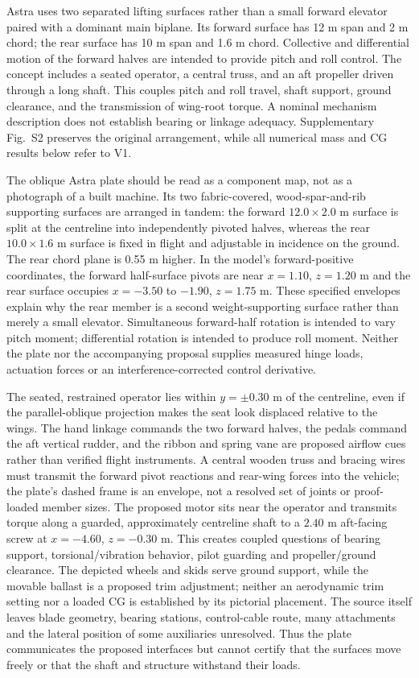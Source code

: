 \documentclass[11pt,a4paper]{article}
\begin{document}
Astra uses two separated lifting surfaces rather than a small forward elevator paired with a dominant main biplane. Its forward surface has 12 m span and 2 m chord; the rear surface has 10 m span and 1.6 m chord. Collective and differential motion of the forward halves are intended to provide pitch and roll control. The concept includes a seated operator, a central truss, and an aft propeller driven through a long shaft. This couples pitch and roll travel, shaft support, ground clearance, and the transmission of wing-root torque. A nominal mechanism description does not establish bearing or linkage adequacy. Supplementary Fig.~S2 preserves the original arrangement, while all numerical mass and CG results below refer to V1.



The oblique Astra plate should be read as a component map, not as a photograph of a built machine. Its two fabric-covered, wood-spar-and-rib supporting surfaces are arranged in tandem: the forward $12.0\times2.0$ m surface is split at the centreline into independently pivoted halves, whereas the rear $10.0\times1.6$ m surface is fixed in flight and adjustable in incidence on the ground. The rear chord plane is 0.55 m higher. In the model's forward-positive coordinates, the forward half-surface pivots are near $x=1.10$, $z=1.20$ m and the rear surface occupies $x=-3.50$ to $-1.90$, $z=1.75$ m. These specified envelopes explain why the rear member is a second weight-supporting surface rather than merely a small elevator. Simultaneous forward-half rotation is intended to vary pitch moment; differential rotation is intended to produce roll moment. Neither the plate nor the accompanying proposal supplies measured hinge loads, actuation forces or an interference-corrected control derivative.

The seated, restrained operator lies within $y=\pm0.30$ m of the centreline, even if the parallel-oblique projection makes the seat look displaced relative to the wings. The hand linkage commands the two forward halves, the pedals command the aft vertical rudder, and the ribbon and spring vane are proposed airflow cues rather than verified flight instruments. A central wooden truss and bracing wires must transmit the forward pivot reactions and rear-wing forces into the vehicle; the plate's dashed frame is an envelope, not a resolved set of joints or proof-loaded member sizes. The proposed motor sits near the operator and transmits torque along a guarded, approximately centreline shaft to a $2.40$ m aft-facing screw at $x=-4.60$, $z=-0.30$ m. This creates coupled questions of bearing support, torsional/vibration behavior, pilot guarding and propeller/ground clearance. The depicted wheels and skids serve ground support, while the movable ballast is a proposed trim adjustment; neither an aerodynamic trim setting nor a loaded CG is established by its pictorial placement. The source itself leaves blade geometry, bearing stations, control-cable route, many attachments and the lateral position of some auxiliaries unresolved. Thus the plate communicates the proposed interfaces but cannot certify that the surfaces move freely or that the shaft and structure withstand their loads.
\end{document}
